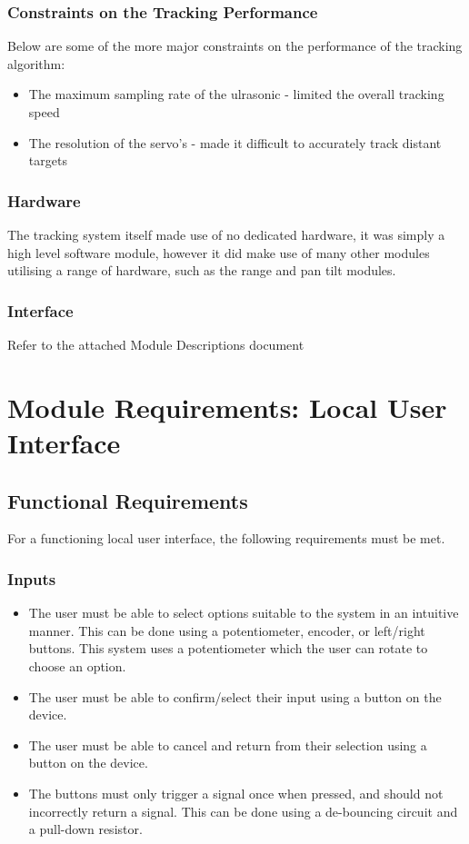 \documentclass[]{report}
\begin{document}
\subsubsection{Constraints on the Tracking Performance}
Below are some of the more major constraints on the performance of the tracking algorithm:
\begin{itemize}
	\item The maximum sampling rate of the ulrasonic - limited the overall tracking speed
	\item The resolution of the servo's - made it difficult to accurately track distant targets
\end{itemize}

\subsubsection{Hardware}
The tracking system itself made use of no dedicated hardware, it was simply a high level software module, however it did make use of many other modules utilising a range of hardware, such as the range and pan tilt modules.

\subsubsection{Interface}
Refer to the attached Module Descriptions document

\section{Module Requirements: Local User Interface}
\subsection{Functional Requirements}
For a functioning local user interface, the following requirements must be met.
\subsubsection{Inputs}
\begin{itemize}
	\item The user must be able to select options suitable to the system in an intuitive manner. This can be done using a potentiometer, encoder, or left/right buttons. This system uses a potentiometer which the user can rotate to choose an option.
	\item The user must be able to confirm/select their input using a button on the device.
	\item The user must be able to cancel and return from their selection using a button on the device.
	\item The buttons must only trigger a signal once when pressed, and should not incorrectly return a signal. This can be done using a de-bouncing circuit and a pull-down resistor.
\end{itemize}
\end{document}
